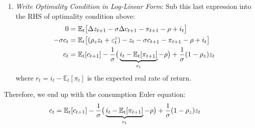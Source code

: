 \documentclass[12pt]{article}
\theoremstyle{plain}
\theoremstyle{definition}
\theoremstyle{remark}
\newcommand{\E}{\mathbb{E}}
\begin{document}
\begin{itemize}
\begin{enumerate}[label=(\roman*)]
      \item
        \emph{Write Optimality Condition in Log-Linear Form}:
        Sub this last expression into the RHS of optimality
        condition above:
        \begin{align*}
          0
          =&\;
          \E_t\big[
            \Delta z_{t+1}
            -\sigma \Delta c_{t+1}
            - \pi_{t+1}
            -\rho + i_t
          \big]\\
          -\sigma c_{t}
          =&\;
          \E_t\big[
            (\rho_z z_t+\varepsilon^z_t) -z_{t}
            -\sigma c_{t+1}
            - \pi_{t+1}
            -\rho + i_t
          \big]\\
          c_{t}
          =&\;
          \E_t[c_{t+1}]
          -
          \frac{1}{\sigma}
          \big(
          \underbrace{%
          i_t-\E_t[\pi_{t+1}]
          }_{r_t}
          -\rho
          \big)
          +
          \frac{1}{\sigma}
          (1-\rho_z) z_t
        \end{align*}
        where $r_t=i_t-\E_t[\pi_t]$ is the expected real rate of return.
    \end{enumerate}
    Therefore, we end up with the consumption Euler equation:
    \begin{align*}
      c_{t}
      =&\;
      \E_t[c_{t+1}]
      -
      \frac{1}{\sigma}
      \big(
      \underbrace{%
      i_t-\E_t[\pi_{t+1}]
      }_{r_t}
      -\rho
      \big)
      +
      \frac{1}{\sigma}
      (1-\rho_z) z_t
    \end{align*}


\end{itemize}
\end{document}
